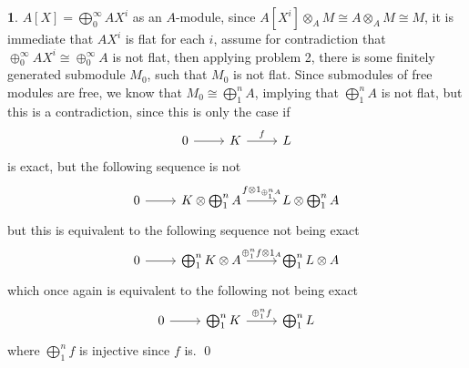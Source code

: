 \documentclass[11pt]{article}
\theoremstyle{definition}
\newtheorem{pb}{}
\begin{document}
    \begin{pb}
        \(A[X] = \bigoplus_0^\infty AX^i\) as an \(A\)-module, since \(A[X^i] \otimes_A M \cong A \otimes_A M \cong M\), it is immediate that \(AX^i\) is flat for each \(i\), assume for contradiction that \(\oplus_0^\infty AX^i \cong \oplus_0^\infty A\) is not flat, then applying problem 2, there is some finitely generated submodule \(M_0\), such that \(M_0\) is not flat. Since submodules of free modules are free, we know that \(M_0 \cong \bigoplus_1^n A\), implying that \(\bigoplus_1^n A\) is not flat, but this is a contradiction, since this is only the case if
        \begin{equation*}
            \begin{tikzcd}
                0 \arrow[r,"{}"] &K \arrow[r,"{f}"] &L
            \end{tikzcd}
        \end{equation*}
        is exact, but the following sequence is not
        \begin{equation*}
            \begin{tikzcd}
                0 \arrow[r,"{}"] &K \otimes \bigoplus_1^n A \arrow[r,"{f \otimes 1_{\oplus_1^n A}}"] &L \otimes \bigoplus_1^n A
            \end{tikzcd}
        \end{equation*}
        but this is equivalent to the following sequence not being exact
        \begin{equation*}
            \begin{tikzcd}
                0 \arrow[r,"{}"]& \bigoplus_1^n K\otimes A \arrow[r,"{\oplus_1^n f \otimes 1_A}"] &\bigoplus_1^n L\otimes A
            \end{tikzcd}
        \end{equation*}
        which once again is equivalent to the following not being exact
        \begin{equation*}
            \begin{tikzcd}
                0 \arrow[r,"{}"] & \bigoplus_1^n K \arrow[r,"{\oplus_1^n f}"] & \bigoplus_1^n L
            \end{tikzcd}
        \end{equation*}
        where \(\bigoplus_1^n f\) is injective since \(f\) is. \qed
    \end{pb}
    
\end{document}

